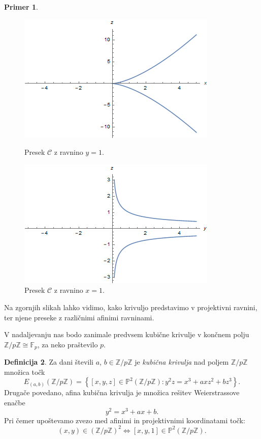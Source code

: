 \documentclass[12pt,a4paper,twoside]{article}
\theoremstyle{definition} %
\newtheorem{definicija}{Definicija}[section]
\newtheorem{primer}[definicija]{Primer}
\theoremstyle{plain} %
\numberwithin{equation}{section}  %
\newcommand{\Z}{\mathbb Z}
\newcommand{\Fq}[1]{{\mathbb{F}_{#1}}}
\newcommand{\PP}{\mathbb P}
\begin{document}
\begin{primer}
\begin{figure}[t]
\centering
\begin{minipage}{.45\textwidth}
\centering
\includegraphics[scale=0.5]{images/projektivnay.png}
\caption[Presek algebraične krivulje z ravnino $y=1$.]{Presek $\mathcal{C}$ z ravnino $y=1$.}
\label{fig:projektivnay}
\end{minipage}%
\hfill
\begin{minipage}{.45\textwidth}
\centering
\includegraphics[scale=0.5]{images/projektivnax.png}
\caption[Presek algebraične krivulje z ravnino $x=1$.]{Presek $\mathcal{C}$ z ravnino $x=1$.}
\label{fig:projektivnax}
\end{minipage}
\end{figure}
Na zgornjih slikah lahko vidimo, kako krivuljo predstavimo v projektivni ravnini, ter njene preseke z različnimi afinimi ravninami.

\end{primer}



V nadaljevanju nas bodo zanimale predvsem kubične krivulje v končnem polju $\mathbb{Z}/p\mathbb{Z} \cong \Fq{p}$, za neko praštevilo $p$.

\begin{definicija}
Za dani števili $a$, $b \in \mathbb{Z}/p\mathbb{Z}$ je \emph{kubična krivulja} nad poljem $\mathbb{Z}/p\mathbb{Z}$ množica točk
$$E_{(a,b)}(\mathbb{Z}/p\mathbb{Z}) =\left\{ [x,y,z] \in \PP^2(\mathbb{Z}/p\mathbb{Z}): y^2z=x^3+axz^2+bz^3 \right\} .$$
Drugače povedano, afina kubična krivulja je množica rešitev Weierstrassove enačbe
$$y^2=x^3+ax+b.$$
Pri čemer upoštevamo zvezo med afinimi in projektivnimi koordinatami točk:
$$(x,y)\in (\Z/p\Z)^2 \Leftrightarrow [x,y,1]\in \PP^2(\Z/p\Z).$$

\end{definicija}
\end{document}
